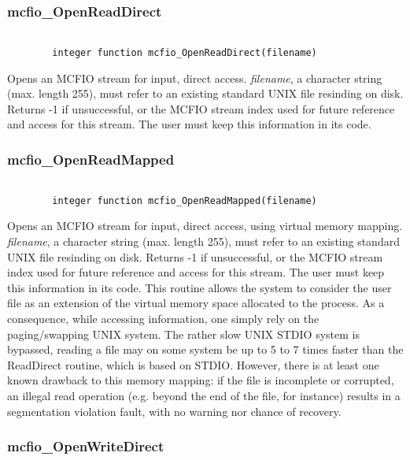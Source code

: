 \subsubsection{mcfio\_OpenReadDirect}
\begin{verbatim}

        integer function mcfio_OpenReadDirect(filename)

\end{verbatim}
 Opens an MCFIO stream for input, direct access. {\em filename}, a  character
 string (max. length 255), must refer to an existing standard UNIX file
 resinding  on disk. Returns -1 if unsuccessful, or the MCFIO stream index 
 used for future reference and access for this stream. The user must keep
 this information in its code. 
 
\subsubsection{mcfio\_OpenReadMapped}
\begin{verbatim}

        integer function mcfio_OpenReadMapped(filename)

\end{verbatim}
 Opens an MCFIO stream for input, direct access, using virtual memory mapping.
  {\em filename}, a  character
 string (max. length 255), must refer to an existing standard UNIX file
 resinding  on disk. Returns -1 if unsuccessful, or the MCFIO stream index 
 used for future reference and access for this stream. The user must keep
 this information in its code.  This routine allows the system to consider the 
 user file as an extension of the virtual memory space allocated to the
 process. As a consequence, while accessing information, one simply rely on the
 paging/swapping UNIX system.  The rather slow UNIX STDIO system is bypassed, 
 reading a file may on some system be up to 5 to 7 times faster than the 
 ReadDirect routine, which is based on STDIO.  However, there is at least one
 known drawback to this memory mapping: if the file is incomplete or corrupted,
 an illegal read operation (e.g. beyond the end of the file, for instance)
 results in a segmentation violation fault, with no warning nor chance of
 recovery. 
 
  
\subsubsection{mcfio\_OpenWriteDirect}

